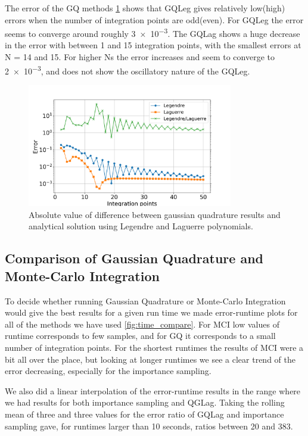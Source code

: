 The error of the GQ methods \cref{fig:gauss_error} shows that GQLeg gives
relatively low(high) errors when the number of integration points are odd(even).
For GQLeg the error seems to converge around roughly \num{ 3e-3}. The GQLag shows
a huge decrease in the error with between 1 and 15 integration points, with
the smallest errors at N = 14 and 15. For higher Ns the error
increases and seem to converge to \num{2e-3}, and does not show the oscillatory
nature of the GQLeg.

\begin{figure}[H]
  \centering
  \includegraphics[width=0.8\textwidth]{../figures/gauss_error.png}
  \caption{Absolute value of difference between gaussian quadrature results and analytical
  solution using Legendre and Laguerre polynomials.}

  \label{fig:gauss_error}
\end{figure}


\subsection{Comparison of Gaussian Quadrature and Monte-Carlo Integration}

To decide whether running Gaussian Quadrature or Monte-Carlo Integration would
give the best results for a given run time we made error-runtime plots for all
of the methods we have used \cref{fig:time_compare}. For MCI low values of runtime
corresponds to few samples, and for GQ it corresponds to a small number of integration points.
For the shortest runtimes the results of MCI were a bit all over the place, but
looking at longer runtimes we see a clear trend of the error decreasing, especially
for the importance sampling.

We also did a linear interpolation of the error-runtime results in the range
where we had results for both importance sampling and QGLag. Taking the rolling
mean of three and three values for the error ratio of GQLag and importance sampling
gave, for runtimes larger than 10 seconds, ratios between 20 and 383.

